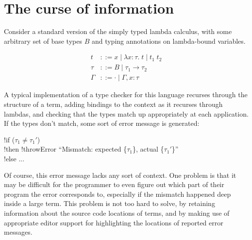 \documentclass[sigplan, screen]{acmart}\settopmatter{printccs=false,printacmref=false}
\begin{document}
\section{The curse of information}

Consider a standard version of the simply typed lambda calculus, with
some arbitrary set of base types $B$ and typing annotations on
lambda-bound variables.

\newcommand{\lam}[3]{\lambda {#1}\!:\!{#2}.\; {#3}}
\newcommand{\app}[2]{{#1}\; {#2}}

\newcommand{\ty}[3]{{#1} \vdash {#2} : {#3}}
\newcommand{\nty}[3]{{#1} \nvdash {#2} : {#3}}

\begin{align*}
  t &::= x \mid \lam x \tau t \mid \app{t_1}{t_2} \\
  \tau &::= B \mid \tau_1 \to \tau_2 \\
  \Gamma &::= \cdot \mid \Gamma,x:\tau
\end{align*}


A typical implementation of a type checker for this language recurses
through the structure of a term, adding bindings to the context as it
recurses through lambdas, and checking that the types match up
appropriately at each application.  If the types don't match, some
sort of error message is generated: \medskip

\begin{acode}
  \> !if ($\tau_1 \neq \tau_1'$) \\
  \> \tb \> !then \> !throwError ``Mismatch: expected \{$\tau_1$\}, actual \{$\tau_1'$\}'' \\
  \> !else \> ...
\end{acode} \medskip

Of course, this error message lacks any sort of context.  One problem
is that it may be difficult for the programmer to even figure out
which part of their program the error corresponds to, especially if
the mismatch happened deep inside a large term. This problem is not
too hard to solve, by retaining information about the source code
locations of terms, and by making use of appropriate editor support for
highlighting the locations of reported error messages.
\end{document}
